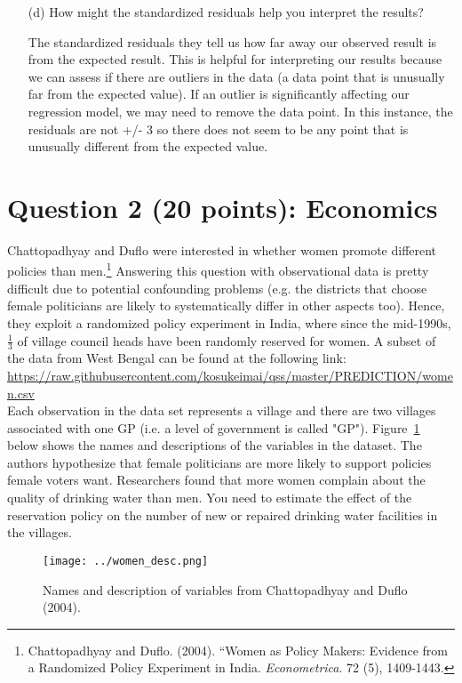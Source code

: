 \documentclass[12pt,letterpaper]{article}
\begin{document}
\begin{enumerate}
\begin{table}[h]
\begin{tabular}{l | c c c }
	\end{tabular}
\end{table}
	
	\vspace{4cm}
	\item [(d)] How might the standardized residuals help you interpret the results? 
	\vspace{1cm} 
	
\noindent The standardized residuals they tell us how far away our observed result is from the expected result. This is helpful for interpreting our results because we can assess if there are outliers in the data (a data point that is unusually far from the expected value). If an outlier is significantly affecting our regression model, we may need to remove the data point. In this instance, the residuals are not +/- 3 so there does not seem to be any point that is unusually different from the expected value.
	
\end{enumerate}
\newpage

\section*{Question 2 (20 points): Economics}
Chattopadhyay and Duflo were interested in whether women promote different policies than men.\footnote{Chattopadhyay and Duflo. (2004). ``Women as Policy Makers: Evidence from a Randomized Policy Experiment in India. \textit{Econometrica}. 72 (5), 1409-1443.} Answering this question with observational data is pretty difficult due to potential confounding problems (e.g. the districts that choose female politicians are likely to systematically differ in other aspects too). Hence, they exploit a randomized policy experiment in India, where since the mid-1990s, $\frac{1}{3}$ of village council heads have been randomly reserved for women. A subset of the data from West Bengal can be found at the following link: \url{https://raw.githubusercontent.com/kosukeimai/qss/master/PREDICTION/women.csv}\\

\noindent Each observation in the data set represents a village and there are two villages associated with one GP (i.e. a level of government is called "GP"). Figure~\ref{fig:women_desc} below shows the names and descriptions of the variables in the dataset. The authors hypothesize that female politicians are more likely to support policies female voters want. Researchers found that more women complain about the quality of drinking water than men. You need to estimate the effect of the reservation policy on the number of new or repaired drinking water facilities in the villages.
\vspace{.5cm}
\begin{figure}[h!]
	\caption{\footnotesize{Names and description of variables from Chattopadhyay and Duflo (2004).}}
	\vspace{.5cm}
	\centering
	\label{fig:women_desc}
	\texttt{[image: ../women\_desc.png]}
\end{figure}		
\end{document}
